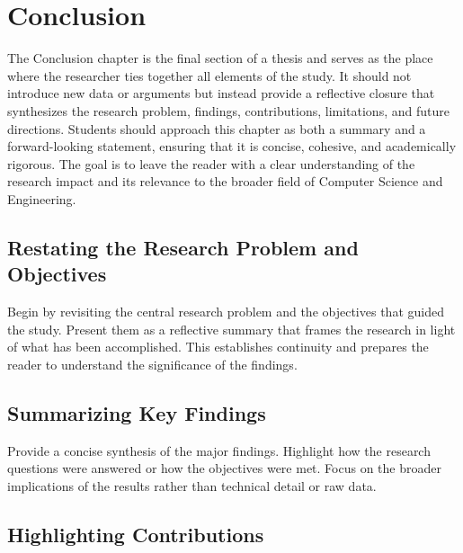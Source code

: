 %

\chapter{Conclusion}
\label{ch:conclusion}

The Conclusion chapter is the final section of a thesis and serves as the place where the researcher ties together all elements of the study. It should not introduce new data or arguments but instead provide a reflective closure that synthesizes the research problem, findings, contributions, limitations, and future directions. Students should approach this chapter as both a summary and a forward-looking statement, ensuring that it is concise, cohesive, and academically rigorous. The goal is to leave the reader with a clear understanding of the research impact and its relevance to the broader field of Computer Science and Engineering.

\section{Restating the Research Problem and Objectives}
\label{sec:restating-problem-objectives}

Begin by revisiting the central research problem and the objectives that guided the study. Present them as a reflective summary that frames the research in light of what has been accomplished. This establishes continuity and prepares the reader to understand the significance of the findings.

\section{Summarizing Key Findings}
\label{sec:summarizing-findings}

Provide a concise synthesis of the major findings. Highlight how the research questions were answered or how the objectives were met. Focus on the broader implications of the results rather than technical detail or raw data.

\section{Highlighting Contributions}
\label{sec:ch5-highlighting-contributions}

